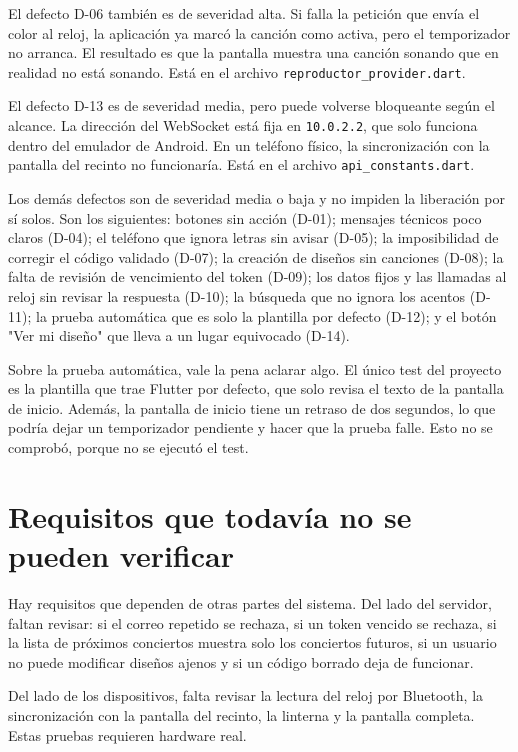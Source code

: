 \documentclass[11pt,a4paper]{article}
\begin{document}
El defecto D-06 también es de severidad alta. Si falla la petición que envía el color al reloj, la aplicación ya marcó la canción como activa, pero el temporizador no arranca. El resultado es que la pantalla muestra una canción sonando que en realidad no está sonando. Está en el archivo \texttt{reproductor\_provider.dart}.

El defecto D-13 es de severidad media, pero puede volverse bloqueante según el alcance. La dirección del WebSocket está fija en \texttt{10.0.2.2}, que solo funciona dentro del emulador de Android. En un teléfono físico, la sincronización con la pantalla del recinto no funcionaría. Está en el archivo \texttt{api\_constants.dart}.

Los demás defectos son de severidad media o baja y no impiden la liberación por sí solos. Son los siguientes: botones sin acción (D-01); mensajes técnicos poco claros (D-04); el teléfono que ignora letras sin avisar (D-05); la imposibilidad de corregir el código validado (D-07); la creación de diseños sin canciones (D-08); la falta de revisión de vencimiento del token (D-09); los datos fijos y las llamadas al reloj sin revisar la respuesta (D-10); la búsqueda que no ignora los acentos (D-11); la prueba automática que es solo la plantilla por defecto (D-12); y el botón "Ver mi diseño" que lleva a un lugar equivocado (D-14).

Sobre la prueba automática, vale la pena aclarar algo. El único test del proyecto es la plantilla que trae Flutter por defecto, que solo revisa el texto de la pantalla de inicio. Además, la pantalla de inicio tiene un retraso de dos segundos, lo que podría dejar un temporizador pendiente y hacer que la prueba falle. Esto no se comprobó, porque no se ejecutó el test.

\section*{Requisitos que todavía no se pueden verificar}

Hay requisitos que dependen de otras partes del sistema. Del lado del servidor, faltan revisar: si el correo repetido se rechaza, si un token vencido se rechaza, si la lista de próximos conciertos muestra solo los conciertos futuros, si un usuario no puede modificar diseños ajenos y si un código borrado deja de funcionar.

Del lado de los dispositivos, falta revisar la lectura del reloj por Bluetooth, la sincronización con la pantalla del recinto, la linterna y la pantalla completa. Estas pruebas requieren hardware real.
\end{document}
